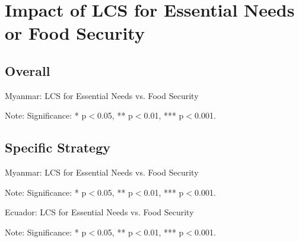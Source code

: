 \documentclass[11pt,harvard]{article}
\begin{document}
\pagebreak

\section{Impact of LCS for Essential Needs or Food Security}

\subsection{Overall}
\begin{table}[htbp]
	\centering
	\begin{adjustbox}{max width=\textwidth}
		\begin{threeparttable}
			\caption{Myanmar: LCS for Essential Needs vs. Food Security}
			\scriptsize
			 
			\label{tab:LCS_F2F_EN_FS_All_Country}
			\begin{tablenotes}
				\item Note: Significance: * p$<$0.05, ** p$<$0.01, *** p$<$0.001. 
			\end{tablenotes}
		\end{threeparttable}
	\end{adjustbox}
\end{table}
\pagebreak

\subsection{Specific Strategy}
\begin{table}[htbp]
	\centering
	\begin{adjustbox}{max width=\textwidth}
		\begin{threeparttable}
			\caption{Myanmar: LCS for Essential Needs vs. Food Security}
			\scriptsize
			 
			\label{tab:LCS_F2F_EN_FS_Myanmar}
			\begin{tablenotes}
				\item Note: Significance: * p$<$0.05, ** p$<$0.01, *** p$<$0.001. 
			\end{tablenotes}
		\end{threeparttable}
	\end{adjustbox}
\end{table}

\begin{table}[htbp]
	\centering
	\begin{adjustbox}{max width=\textwidth}
		\begin{threeparttable}
			\caption{Ecuador: LCS for Essential Needs vs. Food Security}
			\scriptsize
			 
			\label{tab:LCS_F2F_EN_FS_Ecuador}
			\begin{tablenotes}
				\item Note: Significance: * p$<$0.05, ** p$<$0.01, *** p$<$0.001. 
			\end{tablenotes}
		\end{threeparttable}
	\end{adjustbox}
\end{table}
\end{document}

